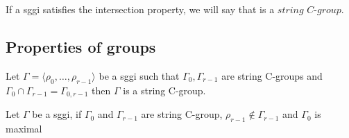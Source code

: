 \begin{definition}
  If a sggi satisfies the intersection property, we will say that is a $\textit{string C-group}$.
\end{definition}

\subsection{Properties of groups}

\begin{property}
  Let $\Gamma = \langle \rho_0, \dots, \rho_{r-1} \rangle$ be a sggi such that $\Gamma_0, \Gamma_{r-1}$ are string C-groups and $\Gamma_0 \cap \Gamma_{r-1} = \Gamma_{0,r-1}$ then $\Gamma$ is a string C-group.
\end{property}

\begin{property}
  Let $\Gamma$ be a sggi, if $\Gamma_0$ and $\Gamma_{r-1}$ are string C-group, $\rho_{r-1} \notin \Gamma_{r-1}$ and $\Gamma_0$ is maximal
\end{property}
